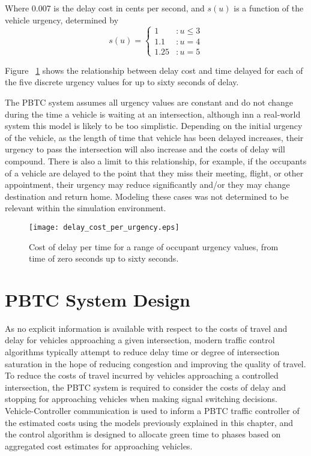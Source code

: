 Where 0.007 is the delay cost in cents per second, and $s(u)$ is a function of the vehicle urgency, determined by
\begin{equation}
	s(u) = \left\{
	      \begin{array}{lr}
	     	1 & : u \leq 3\\
	         1.1  & : u = 4 \\
	         1.25 & : u = 5
	     \end{array}
	   \right.
	\label{delayslopeequation}
\end{equation}

Figure ~\ref{delaycosturgency} shows the relationship between delay cost and time delayed for each of the five discrete urgency values for up to sixty seconds of delay. 

The PBTC system assumes all urgency values are constant and do not change during the time a vehicle is waiting at an intersection, although inn a real-world system this model is likely to be too simplistic. Depending on the initial urgency of the vehicle, as the length of time that vehicle has been delayed increases, their urgency to pass the intersection will also increase and the costs of delay will compound. There is also a limit to this relationship, for example, if the occupants of a vehicle are delayed to the point that they miss their meeting, flight, or other appointment, their urgency may reduce significantly and/or they may change destination and return home. Modeling these cases was not determined to be relevant within the simulation environment. 

\begin{figure}[]
\centering
	\texttt{[image: delay\_cost\_per\_urgency.eps]}
	\caption{Cost of delay per time for a range of occupant urgency values, from time of zero seconds up to sixty seconds. }
\label{delaycosturgency}
\end{figure}

\section{PBTC System Design}
 
As no explicit information is available with respect to the costs of travel and delay for vehicles approaching a given intersection, modern traffic control algorithms typically attempt to reduce delay time or degree of intersection saturation in the hope of reducing congestion and improving the quality of travel. To reduce the costs of travel incurred by vehicles approaching a controlled intersection, the PBTC system is required to consider the costs of delay and stopping for approaching vehicles when making signal switching decisions. Vehicle-Controller communication is used to inform a PBTC traffic controller of the estimated costs using the models previously explained in this chapter, and the control algorithm is designed to allocate green time to phases based on aggregated cost estimates for approaching vehicles.

